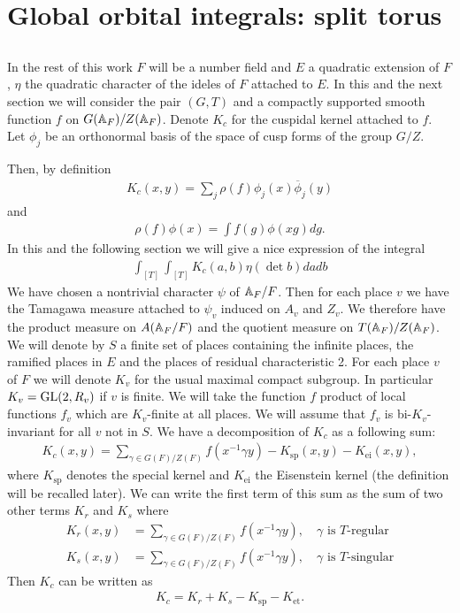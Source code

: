 \section{Global orbital integrals: split torus}

\subsection{}
In the rest of this work $F$ will be a number field and $E$ a quadratic extension of $F$, $\eta$ the quadratic character of the ideles of $F$ attached to $E$.
In this and the next section we will consider the pair $(G, T)$ and a compactly supported smooth function $f$ on $G(\mathbb{A}_F) /Z(\mathbb{A}_F)$.
Denote $K_c$ for the cuspidal kernel attached to $f$.
Let $\phi_j$ be an orthonormal basis of the space of cusp forms of the group $G/Z$.

Then, by definition
\begin{align}
    K_c(x, y) = \sum_{j} \rho(f) \phi_{j}(x) \overline{\phi}_{j}(y)
\end{align}
and
\begin{align}
    \rho(f) \phi(x) = \int f(g) \phi(xg) dg.
\end{align}
In this and the following section we will give a nice expression of the integral
\begin{align}
    \int_{[T]} \int_{[T]} K_c(a, b) \eta(\det b) da db
\end{align}
We have chosen a nontrivial character $\psi$ of $\mathbb{A}_F / F$.
Then for each place $v$ we have the Tamagawa measure attached to $\psi_v$ induced on $A_v$ and $Z_v$.
We therefore have the product measure on $A(\mathbb{A}_F/F)$ and the quotient measure on $T(\mathbb{A}_F) / Z(\mathbb{A}_F)$.
We will denote by $S$ a finite set of places containing the infinite places, the ramified places in $E$ and the places of residual characteristic 2.
For each place $v$ of $F$ we will denote $K_v$ for the usual maximal compact subgroup.
In particular $K_v = \mathrm{GL}(2, R_v)$ if $v$ is finite.
We will take the function $f$ product of local functions $f_v$ which are $K_v$-finite at all places.
We will assume that $f_v$ is bi-$K_v$-invariant for all $v$ not in $S$.
We have a decomposition of $K_c$ as a following sum:
\begin{align}
    K_c(x, y) = \sum_{\gamma \in G(F) / Z(F)} f(x^{-1}\gamma y) - K_{\mathrm{sp}}(x, y) - K_{\mathrm{ei}}(x, y),
\end{align}
where $K_{\mathrm{sp}}$ denotes the special kernel and $K_{\mathrm{ei}}$ the Eisenstein kernel (the definition will be recalled later).
We can write the first term of this sum as the sum of two other terms $K_r$ and $K_s$ where
\begin{align}
    K_{r}(x, y) &= \sum_{\gamma \in G(F) / Z(F)} f(x^{-1}\gamma y), \quad \gamma\text{ is }T\text{-regular} \\
    K_{s}(x, y) &= \sum_{\gamma \in G(F) / Z(F)} f(x^{-1}\gamma y), \quad \gamma\text{ is }T\text{-singular}
\end{align}
Then $K_c$ can be written as
\begin{align}
    K_c = K_r + K_s - K_{\mathrm{sp}} - K_{\mathrm{et}}.
\end{align}

